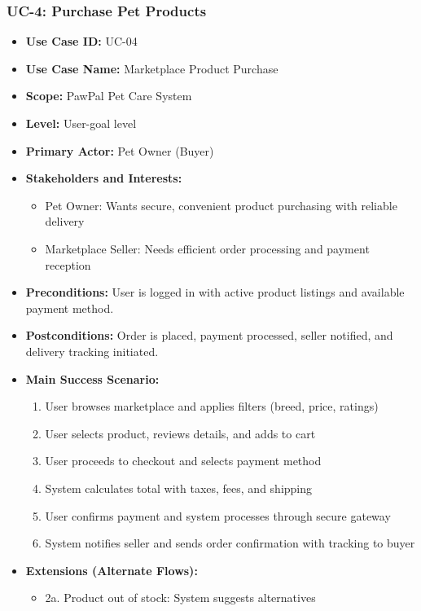 \subsubsection*{UC-4: Purchase Pet Products}
\begin{itemize}
    \item \textbf{Use Case ID:} UC-04
    \item \textbf{Use Case Name:} Marketplace Product Purchase
    \item \textbf{Scope:} PawPal Pet Care System
    \item \textbf{Level:} User-goal level
    \item \textbf{Primary Actor:} Pet Owner (Buyer)
    \item \textbf{Stakeholders and Interests:}
    \begin{itemize}
        \item Pet Owner: Wants secure, convenient product purchasing with reliable delivery
        \item Marketplace Seller: Needs efficient order processing and payment reception
    \end{itemize}
    \item \textbf{Preconditions:} User is logged in with active product listings and available payment method.
    \item \textbf{Postconditions:} Order is placed, payment processed, seller notified, and delivery tracking initiated.
    \item \textbf{Main Success Scenario:}
    \begin{enumerate}
        \item User browses marketplace and applies filters (breed, price, ratings)
        \item User selects product, reviews details, and adds to cart
        \item User proceeds to checkout and selects payment method
        \item System calculates total with taxes, fees, and shipping
        \item User confirms payment and system processes through secure gateway
        \item System notifies seller and sends order confirmation with tracking to buyer
    \end{enumerate}
    \item \textbf{Extensions (Alternate Flows):}
    \begin{itemize}
        \item 2a. Product out of stock: System suggests alternatives

\end{itemize}
\end{itemize}
